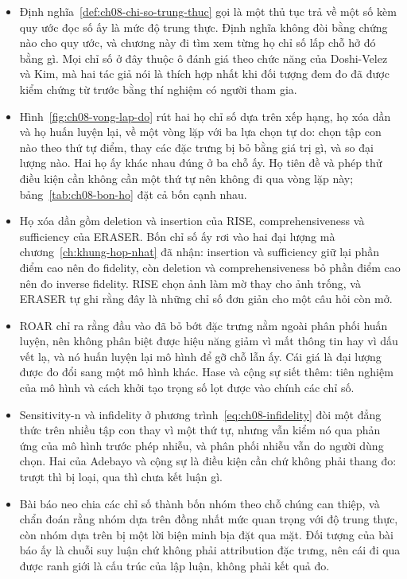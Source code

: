 \begin{tomtat}
\begin{itemize}
  \item Định nghĩa~\ref{def:ch08-chi-so-trung-thuc} gọi
   là một thủ tục trả về một số kèm
  quy ước đọc số ấy là mức độ trung thực. Định nghĩa
  không đòi bằng chứng nào cho quy ước, và chương này đi tìm xem từng họ chỉ số
  lấp chỗ hở đó bằng gì. Mọi chỉ số ở đây thuộc ô đánh giá theo chức năng của
  Doshi-Velez và Kim, mà hai tác giả nói là thích hợp nhất khi đối tượng đem đo
  đã được kiểm chứng từ trước bằng thí nghiệm có người tham gia.
  \item Hình~\ref{fig:ch08-vong-lap-do} rút hai họ chỉ số dựa trên xếp hạng, họ
  xóa dần và họ huấn luyện lại, về một vòng lặp với ba
  lựa chọn tự do: chọn tập con nào theo thứ tự điểm, thay các đặc trưng bị bỏ
  bằng giá trị gì, và so đại lượng nào. Hai họ ấy khác nhau đúng ở ba chỗ ấy.
  Họ tiên đề và phép thử điều kiện cần không cần một thứ tự nên không đi qua
  vòng lặp này; bảng~\ref{tab:ch08-bon-ho} đặt cả bốn cạnh nhau.
  \item Họ xóa dần gồm deletion và insertion của RISE, comprehensiveness và
  sufficiency của ERASER. Bốn chỉ số ấy rơi vào hai đại lượng mà
  chương~\ref{ch:khung-hop-nhat} đã nhận: insertion và sufficiency giữ lại phần
  điểm cao nên đo fidelity, còn deletion và comprehensiveness bỏ phần điểm cao
  nên đo inverse fidelity. RISE chọn ảnh làm mờ thay cho ảnh
  trống, và ERASER tự ghi rằng đây là những chỉ số đơn giản cho một câu hỏi còn
  mở.
  \item ROAR chỉ ra rằng đầu vào đã bỏ bớt đặc trưng nằm ngoài phân phối huấn
  luyện, nên không phân biệt được hiệu năng giảm vì mất thông tin hay vì dấu vết
  lạ, và nó huấn luyện lại mô hình để gỡ chỗ lẫn ấy. Cái giá là đại lượng được
  đo đổi sang một mô hình khác. Hase và cộng sự siết thêm: tiên nghiệm của mô
  hình và cách khởi tạo trọng số lọt được vào chính các chỉ số.
  \item Sensitivity-n và infidelity ở phương trình~\ref{eq:ch08-infidelity} đòi
  một đẳng thức trên nhiều tập con thay vì một thứ tự, nhưng vẫn kiểm nó qua
  phản ứng của mô hình trước phép nhiễu, và phân phối nhiễu vẫn do người dùng
  chọn. Hai  của Adebayo và cộng
  sự là điều kiện cần chứ không phải thang đo: trượt thì bị loại, qua thì chưa kết luận gì.
  \item Bài báo neo chia các chỉ số thành bốn nhóm theo chỗ chúng can thiệp, và
  chẩn đoán rằng nhóm dựa trên  đồng nhất mức
  quan trọng với độ
  trung thực, còn nhóm dựa trên 
  bị một lời biện minh bịa đặt qua mặt. Đối tượng của bài báo ấy là chuỗi suy luận chứ không phải
  attribution đặc trưng, nên cái đi qua được ranh giới là cấu trúc của lập luận,
  không phải kết quả đo.
\end{itemize}
\end{tomtat}

